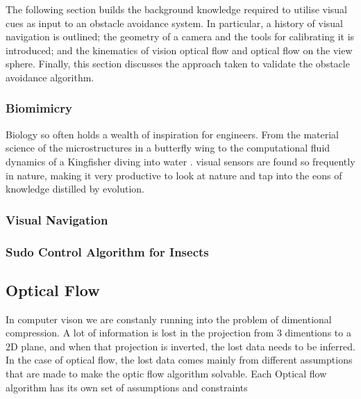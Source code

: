 \documentclass{UoNMCHA}
\numberwithin{equation}{section}
\begin{document}
The following section builds the background knowledge required to utilise visual cues as input to an obstacle avoidance system. In particular, a history of visual navigation is outlined;  the geometry of a camera and the tools for calibrating it is introduced; and the kinematics of vision optical flow and optical flow on the view sphere. Finally, this section discusses the approach taken to validate the obstacle avoidance algorithm.


\subsubsection{Biomimicry} %
Biology so often holds a wealth of inspiration for engineers. From the material science of the microstructures in a butterfly wing to the computational fluid dynamics of a Kingfisher diving into water \citep{benyus1997biomimicry}. visual sensors are found so frequently in nature, making it very productive to look at nature and tap into the eons of knowledge distilled by evolution.

\subsubsection{Visual Navigation}
\subsubsection{Sudo Control Algorithm for Insects}
\subsubsection{}
\subsection{Optical Flow} %
In computer vison we are constanly running into the problem of dimentional compression. A lot of information is lost in the projection from 3 dimentions to a 2D plane, and when that projection is inverted, the lost data needs to be inferred. In the case of optical flow, the lost data comes mainly from different assumptions that are made to make the optic flow algorithm solvable. Each Optical flow algorithm has its own set of assumptions and constraints
\end{document}
